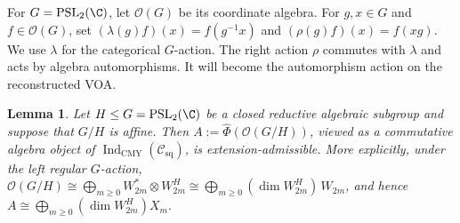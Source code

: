 \documentclass[12pt,leqno]{amsart}
\numberwithin{equation}{section} \newtheorem{thm}{Theorem}[section] \newtheorem{lem}[thm]{Lemma} \newtheorem{ex}[thm]{Example} \newtheorem{prop}[thm]{Proposition} \newtheorem{cor}[thm]{Corollary} \newtheorem{defi}[thm]{Definition} \newtheorem{rmk}[thm]{Remark} \newtheorem{notation}[thm]{Notation}
\newcommand{\OO}{\mathcal O}
\newcommand{\Csq}{\mathcal C_{\mathrm{sq}}}
\newcommand{\IndCMY}{\operatorname{Ind}_{\mathrm{CMY}}}
\newcommand{\PSLtwo}{\operatorname{PSL}_2(\C)}
\begin{document}
For $G=\PSLtwo$, let $\OO(G)$ be its coordinate algebra. For $g,x\in G$ and $f\in\OO(G)$, set \((\lambda(g)f)(x)=f(g^{-1}x)\) and \((\rho(g)f)(x)=f(xg)\). We use $\lambda$ for the categorical $G$-action. The right action $\rho$ commutes with $\lambda$ and acts by algebra automorphisms. It will become the automorphism action on the reconstructed VOA.

\begin{lem}\label{lem:admissible-homogeneous}
Let $H\le G=\PSLtwo$ be a closed reductive algebraic subgroup and suppose that $G/H$ is affine. Then \(A:=\widehat\Phi(\OO(G/H))\), viewed as a commutative algebra object of \(\IndCMY(\Csq)\), is extension-admissible. More explicitly, under the left regular $G$-action, \(\OO(G/H) \cong \bigoplus_{m\ge0}W_{2m}^*\otimes W_{2m}^H \cong \bigoplus_{m\ge0}(\dim W_{2m}^H)\,W_{2m}\), and hence \(A\cong\bigoplus_{m\ge0}(\dim W_{2m}^H) X_m.\)
\end{lem}
\end{document}
